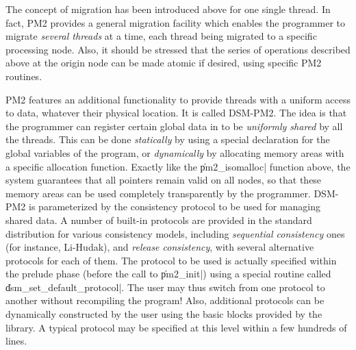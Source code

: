 The concept of migration has been introduced above for one single
thread. In fact, PM2 provides a general migration facility which
enables the programmer to migrate \emph{several threads} at a time,
each thread being migrated to a specific processing node. Also, it
should be stressed that the series of operations described above at
the origin node can be made atomic if desired, using specific PM2
routines.

PM2 features an additional functionality to provide threads with a
uniform access to data, whatever their physical location. It is called
DSM-PM2. The idea is that the programmer can register certain global
data in to be \emph{uniformly shared} by all the threads. This can be
done \emph{statically} by using a special declaration for the global
variables of the program, or \emph{dynamically} by allocating memory
areas with a specific allocation function. Exactly like the
\|pm2_isomalloc| function above, the system guarantees that all
pointers remain valid on all nodes, so that these memory areas can be
used completely transparently by the programmer.  DSM-PM2 is
parameterized by the consistency protocol to be used for managing
shared data. A number of built-in protocols are provided in the
standard distribution for various consistency models, including
\emph{sequential consistency} ones (for instance, Li-Hudak), and
\emph{release consistency}, with several alternative protocols for
each of them. The protocol to be used is actually specified within the
prelude phase (before the call to \|pm2_init|) using a special routine
called \|dsm_set_default_protocol|. The user may thus switch from one
protocol to another without recompiling the program! Also, additional
protocols can be dynamically constructed by the user using the basic
blocks provided by the library. A typical protocol may be specified at
this level within a few hundreds of lines.
